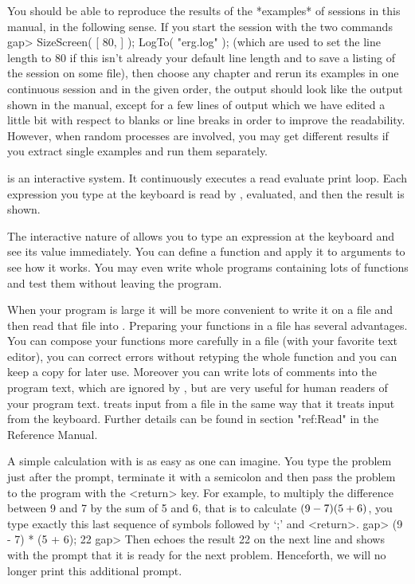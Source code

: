 You should be able to reproduce the results of the *examples* of {\GAP}
sessions in this manual, in the following sense.
If you start the {\GAP} session with the two commands
\begintt
gap> SizeScreen( [ 80, ] ); LogTo( "erg.log" );
\endtt
(which are used to set the line length to 80 if this isn't already your
default line length and to save a listing of
the session on some file), then choose any chapter and rerun its
examples in one continuous session and in the given order, the {\GAP}
output should look like the output shown in the manual, except for a
few lines of output which we have edited a little bit with respect to
blanks or line breaks in order to improve the readability.  However,
when random processes are involved, you may get different results if
you extract single examples and run them separately.

\null

{\GAP}  is  an   interactive   system.    It  continuously   executes   a
read evaluate print loop.  Each  expression you type  at the  keyboard is
read by {\GAP}, evaluated, and then the result is shown.

The interactive nature of {\GAP} allows you to type  an expression at the
keyboard and see its value immediately.  You can  define a  function  and
apply it to arguments  to  see how  it  works.  You may  even write whole
programs containing lots  of functions and test them without leaving  the
program.

When  your program is large it  will be more  convenient to write it on a
file and then read that file  into {\GAP}. Preparing  your functions in a
file   has  several advantages.  You  can   compose  your functions  more
carefully in a  file (with your favorite  text  editor), you can  correct
errors without retyping  the whole function and you  can keep a  copy for
later use. Moreover you can write lots of comments into the program text,
which are ignored  by {\GAP}, but are   very useful for  human readers of
your program text. {\GAP} treats  input from a  file in the same way that
it treats input from the keyboard. Further details can be found in
section "ref:Read" in the Reference Manual.

A simple calculation with {\GAP} is as easy as one can imagine.  You type
the problem just after the prompt, terminate it with a semicolon and then
pass the problem to the  program with the <return> key.  For  example, to
multiply the difference between 9 and 7 by the sum of 5 and 6, that is to
calculate  $(9 - 7) \* (5 + 6)$, you type exactly this  last sequence  of
symbols followed by `;' and <return>.
\beginexample
gap> (9 - 7) * (5 + 6);
22
gap> 
\endexample
Then {\GAP} echoes   the result 22 on the   next line and shows with  the
prompt  that it is ready  for the  next problem.  Henceforth,  we will no
longer print this additional prompt.

